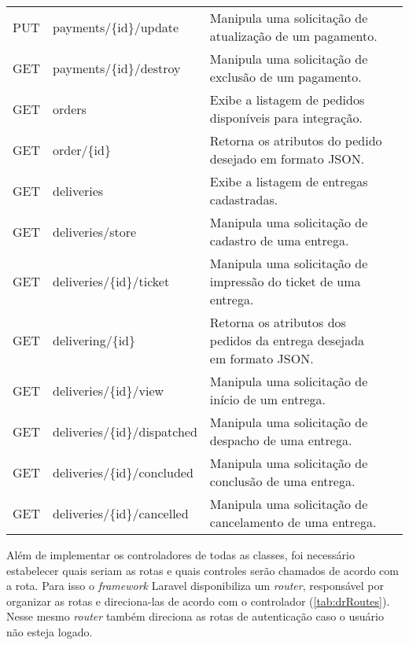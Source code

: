 \begin{table}[H]
\begin{tabular}{llp{9.2cm}l}
PUT & payments/\{id\}/update & Manipula uma solicitação de atualização de um pagamento. \\
GET & payments/\{id\}/destroy & Manipula uma solicitação de exclusão de um pagamento. \\
GET & orders & Exibe a listagem de pedidos disponíveis para integração. \\
GET & order/\{id\} & Retorna os atributos do pedido desejado em formato JSON. \\
GET & deliveries & Exibe a listagem de entregas cadastradas. \\
GET & deliveries/store & Manipula uma solicitação de cadastro de uma entrega. \\
GET & deliveries/\{id\}/ticket & Manipula uma solicitação de impressão do ticket de uma entrega. \\
GET & delivering/\{id\} & Retorna os atributos dos pedidos da entrega desejada em formato JSON. \\
GET & deliveries/\{id\}/view & Manipula uma solicitação de início de um entrega. \\
GET & deliveries/\{id\}/dispatched & Manipula uma solicitação de despacho de uma entrega. \\
GET & deliveries/\{id\}/concluded & Manipula uma solicitação de conclusão de uma entrega. \\
GET & deliveries/\{id\}/cancelled & Manipula uma solicitação de cancelamento de uma entrega.
\end{tabular}
\end{table}

\newpage
Além de implementar os controladores de todas as classes, foi necessário estabelecer quais seriam as rotas e quais controles serão chamados de acordo com a rota. Para isso o \textit{framework} Laravel disponibiliza um \textit{router}, responsável por organizar as rotas e direciona-las de acordo com o controlador (\autoref{tab:drRoutes}). Nesse mesmo \textit{router} também direciona as rotas de autenticação caso o usuário não esteja logado.
